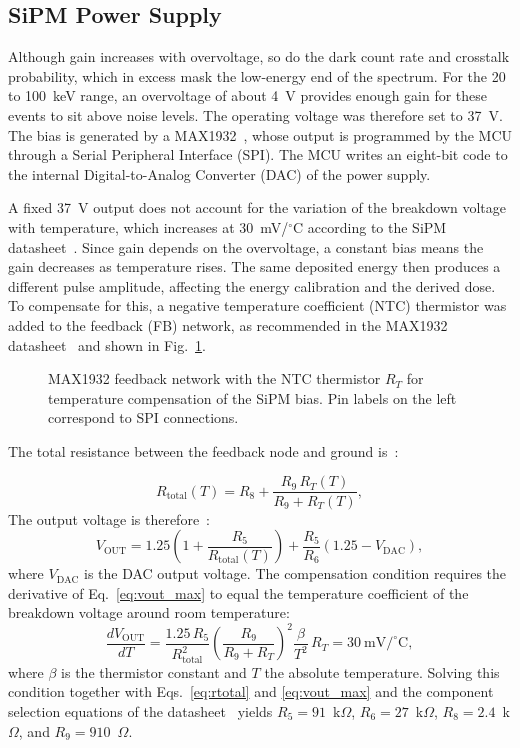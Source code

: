 \subsection{SiPM Power Supply}
\label{sec:sipm_power_supply}
Although gain increases with overvoltage, so do the dark count rate and crosstalk probability, which in excess mask the low-energy end of the spectrum. For the 20 to 100~keV range, an overvoltage of about 4~V provides enough gain for these events to sit above noise levels. The operating voltage was therefore set to 37~V. The bias is generated by a MAX1932~\cite{132}, whose output is programmed by the MCU through a Serial Peripheral Interface (SPI). The MCU writes an eight-bit code to the internal Digital-to-Analog Converter (DAC) of the power supply.

A fixed 37~V output does not account for the variation of the breakdown voltage with temperature, which increases at 30~mV/$^\circ$C according to the SiPM datasheet~\cite{131}. Since gain depends on the overvoltage, a constant bias means the gain decreases as temperature rises. The same deposited energy then produces a different pulse amplitude, affecting the energy calibration and the derived dose. To compensate for this, a negative temperature coefficient (NTC) thermistor was added to the feedback (FB) network, as recommended in the MAX1932 datasheet~\cite{132} and shown in Fig.~\ref{fig:bias}.
\begin{figure}[H]
  \centering
  \resizebox{!}{5.2cm}{}
  \caption[SiPM bias supply.]{MAX1932 feedback network with the NTC thermistor $R_T$ for temperature compensation of the SiPM bias. Pin labels on the left correspond to SPI connections.}
  \label{fig:bias}
\end{figure}

\noindent The total resistance between the feedback node and ground is~\cite{132}:

\begin{equation}
R_\text{total}(T) = R_8 + \frac{R_9\,R_T(T)}{R_9 + R_T(T)},
\label{eq:rtotal}
\end{equation}
The output voltage is therefore~\cite{132}:
\begin{equation}
V_\text{OUT} = 1.25\left(1 + \frac{R_5}{R_\text{total}(T)}\right) + \frac{R_5}{R_6}\left(1.25 - V_\text{DAC}\right),
\label{eq:vout_max}
\end{equation}
where $V_\text{DAC}$ is the DAC output voltage. The compensation condition requires the derivative of Eq.~\ref{eq:vout_max} to equal the temperature coefficient of the breakdown voltage around room temperature:
\begin{equation}
\frac{dV_\text{OUT}}{dT} = \frac{1.25\,R_5}{R_\text{total}^2}\left(\frac{R_9}{R_9 + R_T}\right)^2 \frac{\beta}{T^2}\,R_T = 30~\text{mV/}^\circ\text{C},
\label{eq:slope}
\end{equation}
where $\beta$ is the thermistor constant and $T$ the absolute temperature. Solving this condition together with Eqs.~\ref{eq:rtotal} and \ref{eq:vout_max} and the component selection equations of the datasheet~\cite{132} yields $R_5 = 91$~k$\Omega$, $R_6 = 27$~k$\Omega$, $R_8 = 2.4$~k$\Omega$, and $R_9 = 910$~$\Omega$.

